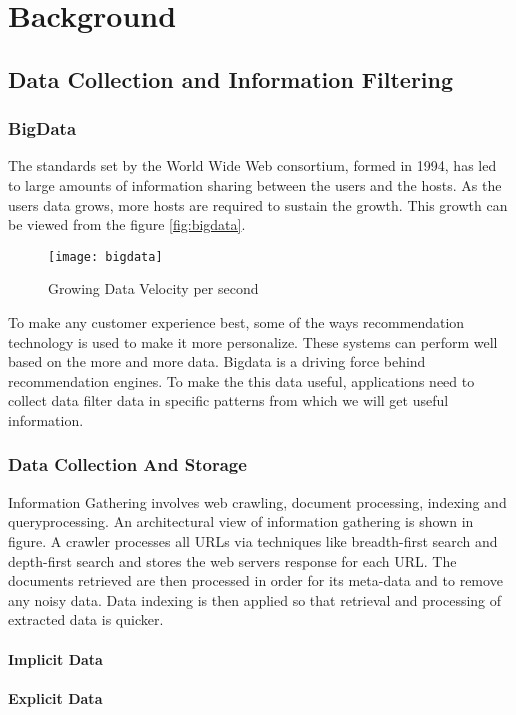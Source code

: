 \chapter{Background}
\section{Data Collection and Information Filtering}
\subsection{BigData}
The standards set by the World Wide Web consortium, formed in 1994, has led to large amounts of information sharing between the users and the hosts. As the users data grows, more hosts are required to sustain the growth. This growth can be viewed from the figure \autoref{fig:bigdata}.
\\
\begin{figure}[H]
	\centering
	\texttt{[image: bigdata]}
	\caption{Growing Data Velocity per second}
	\label{fig:bigdata}
\end{figure}

\noindent To make any customer experience best, some of the ways recommendation technology is used to make it more personalize. These systems can perform well based on the more and more data. Bigdata is a driving force behind recommendation engines.
To make the this data useful, applications need to collect data filter data in specific patterns from which we will get useful information.

\subsection{Data Collection And Storage}

Information Gathering involves web crawling, document processing, indexing and queryprocessing. An architectural view of information gathering is shown in figure. A crawler processes all URLs via techniques like breadth-first search and depth-first search and stores the web servers response for each URL. The documents retrieved are then processed in order for its meta-data and to remove any noisy data. Data indexing is then applied so that retrieval and processing of extracted data is quicker.

\subsubsection{Implicit Data}
\subsubsection{Explicit Data}


